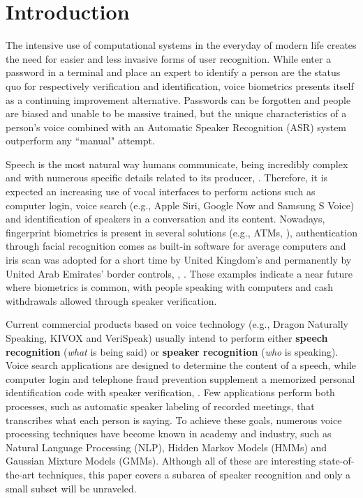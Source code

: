 \chapter{Introduction}
\label{ch:intro}

The intensive use of computational systems in the everyday of modern life creates the need for easier and less invasive forms of user recognition. While enter a password in a terminal and place an expert to identify a person are the status quo for respectively verification and identification, voice biometrics presents itself as a continuing improvement alternative. Passwords can be forgotten and people are biased and unable to be massive trained, but the unique characteristics of a person's voice combined with an Automatic Speaker Recognition (ASR) system outperform any ``manual" attempt.

Speech is the most natural way humans communicate, being incredibly complex and with numerous specific details related to its producer, . Therefore, it is expected an increasing use of vocal interfaces to perform actions such as computer login, voice search (e.g., Apple Siri, Google Now and Samsung S Voice) and identification of speakers in a conversation and its content. Nowadays, fingerprint biometrics is present in several solutions (e.g., ATMs, ), authentication through facial recognition comes as built-in software for average computers and iris scan was adopted for a short time by United Kingdom's and permanently by United Arab Emirates' border controls, , . These examples indicate a near future where biometrics is common, with people speaking with computers and cash withdrawals allowed through speaker verification.

Current commercial products based on voice technology (e.g., Dragon Naturally Speaking, KIVOX and VeriSpeak) usually intend to perform either \textbf{speech recognition} (\emph{what} is being said) or \textbf{speaker recognition} (\emph{who} is speaking). Voice search applications are designed to determine the content of a speech, while computer login and telephone fraud prevention supplement a memorized personal identification code with speaker verification, . Few applications perform both processes, such as automatic speaker labeling of recorded meetings, that transcribes what each person is saying. To achieve these goals, numerous voice processing techniques have become known in academy and industry, such as Natural Language Processing (NLP), Hidden Markov Models (HMMs) and Gaussian Mixture Models (GMMs). Although all of these are interesting state-of-the-art techniques, this paper covers a subarea of speaker recognition and only a small subset will be unraveled.

